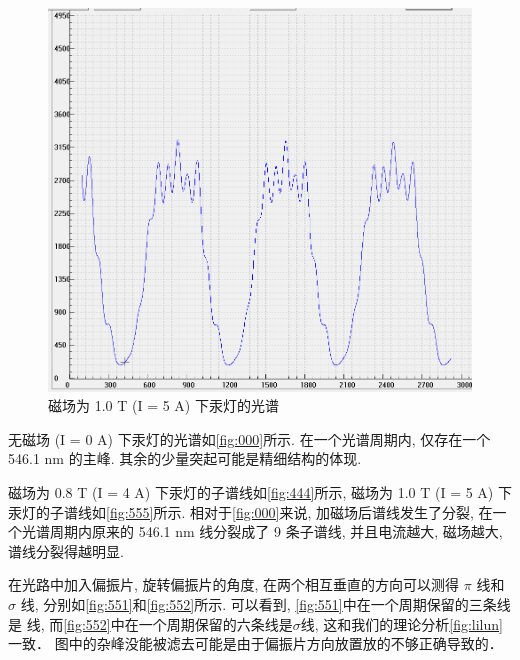 \documentclass[font=default]{mpltx}
\begin{document}
\begin{figure}[htbp]
  \centering
  \includegraphics[width=0.85\linewidth]{fig/2.png}
  \caption{磁场为 1.0 T (I = 5 A) 下汞灯的光谱}
  \label{fig:555}
\end{figure}

  无磁场 (I = 0 A) 下汞灯的光谱如\autoref{fig:000}所示. 在一个光谱周期内, 仅存在一个 546.1 nm 的主峰. 其余的少量突起可能是精细结构的体现.
  \par
  磁场为 0.8 T (I = 4 A) 下汞灯的子谱线如\autoref{fig:444}所示, 磁场为 1.0 T (I = 5 A) 下汞灯的子谱线如\autoref{fig:555}所示. 
  相对于\autoref{fig:000}来说, 加磁场后谱线发生了分裂, 在一个光谱周期内原来的 546.1 nm 线分裂成了 9 条子谱线, 
  并且电流越大, 磁场越大, 谱线分裂得越明显. 

  在光路中加入偏振片, 旋转偏振片的角度, 在两个相互垂直的方向可以测得 $\pi$ 线和 $\sigma$ 线, 分别如\autoref{fig:551}和\autoref{fig:552}所示.
  可以看到, \autoref{fig:551}中在一个周期保留的三条线是 \pi 线, 
  而\autoref{fig:552}中在一个周期保留的六条线是$\sigma$线, 这和我们的理论分析\autoref{fig:lilun}一致．
  图中的杂峰没能被滤去可能是由于偏振片方向放置放的不够正确导致的．
\end{document}
